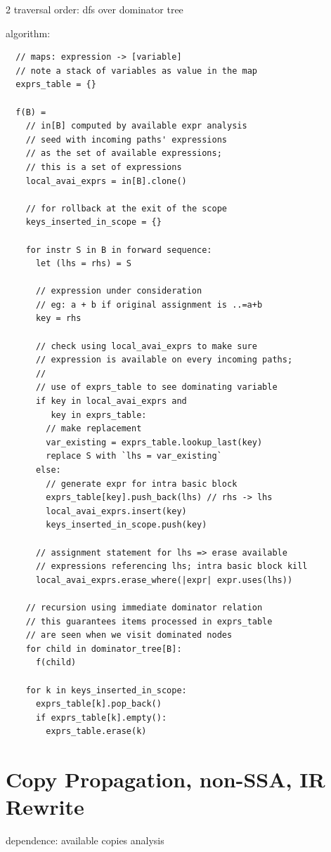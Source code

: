 \documentclass[8pt]{extarticle}
\begin{document}
\begin{multicols*}{2}
  traversal order: dfs over dominator tree

  algorithm:
  
  \begin{verbatim}
  // maps: expression -> [variable]
  // note a stack of variables as value in the map
  exprs_table = {}

  f(B) =  
    // in[B] computed by available expr analysis
    // seed with incoming paths' expressions
    // as the set of available expressions;
    // this is a set of expressions
    local_avai_exprs = in[B].clone()

    // for rollback at the exit of the scope
    keys_inserted_in_scope = {}

    for instr S in B in forward sequence:
      let (lhs = rhs) = S

      // expression under consideration
      // eg: a + b if original assignment is ..=a+b
      key = rhs

      // check using local_avai_exprs to make sure
      // expression is available on every incoming paths;
      //
      // use of exprs_table to see dominating variable
      if key in local_avai_exprs and
         key in exprs_table:
        // make replacement
        var_existing = exprs_table.lookup_last(key)
        replace S with `lhs = var_existing`
      else:
        // generate expr for intra basic block
        exprs_table[key].push_back(lhs) // rhs -> lhs
        local_avai_exprs.insert(key)
        keys_inserted_in_scope.push(key)

      // assignment statement for lhs => erase available
      // expressions referencing lhs; intra basic block kill
      local_avai_exprs.erase_where(|expr| expr.uses(lhs))

    // recursion using immediate dominator relation
    // this guarantees items processed in exprs_table
    // are seen when we visit dominated nodes
    for child in dominator_tree[B]:
      f(child)

    for k in keys_inserted_in_scope:
      exprs_table[k].pop_back()
      if exprs_table[k].empty():
        exprs_table.erase(k)
  \end{verbatim}

  \section{Copy Propagation, non-SSA, IR Rewrite}

  dependence: available copies analysis


\end{multicols*}
\end{document}
